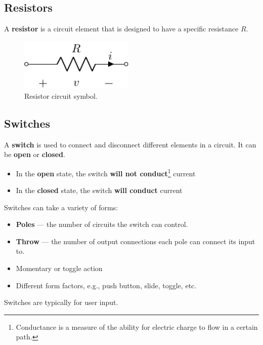 \documentclass[a4paper]{report}
\begin{document}
\subsection{Resistors}
A \textbf{resistor} is a circuit element that is designed to have a specific resistance \(R\).
\begin{figure}[H]
    \centering
    \includegraphics[height = 2.5cm, keepaspectratio = true]{figures/resistor.pdf}
    \caption{Resistor circuit symbol.} %
\end{figure}
\subsection{Switches}
A \textbf{switch} is used to connect and disconnect different elements in a circuit. It can be \textbf{open}
or \textbf{closed}.
\begin{itemize}
    \item In the \textbf{open} state, the switch \textbf{will not conduct}\footnote{Conductance is a measure of the ability for electric charge to flow in a certain path.} current
    \item In the \textbf{closed} state, the switch \textbf{will conduct} current
\end{itemize}
Switches can take a variety of forms:
\begin{itemize}
    \item \textbf{Poles} --- the number of circuits the switch can control.
    \item \textbf{Throw} --- the number of output connections each pole can connect its input to.
    \item Momentary or toggle action
    \item Different form factors, e.g., push button, slide, toggle, etc.
\end{itemize}
Switches are typically for user input.
\end{document}
